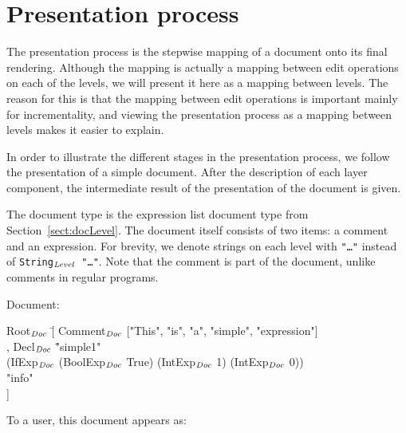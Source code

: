 \documentclass{speauth}
\begin{document}
%																
%																
%																
\section{Presentation process} \label{sect:presprocess}

The presentation process is the stepwise mapping of a document onto its final rendering. Although the mapping is actually a mapping between edit operations on each of the levels, we will present it here as a mapping between levels. The reason for this is that the mapping between edit operations is important mainly for incrementality, and viewing the presentation process as a mapping between levels makes it easier to explain.

In order to illustrate the different stages in the presentation process, we follow the presentation of a simple document. After the description of each layer component, the intermediate result of the presentation of the document is given. 

The document type is the expression list document type from Section~\ref{sect:docLevel}. The document itself consists of two items: a comment and an expression. For brevity, we denote strings on each level with {\tt "\dots"} instead of {\tt String$_{\mathit{Level}}$ "\dots"}. Note that the comment is part of the document, unlike comments in regular programs.

Document:
\small \ttfamily
\begin{tabbing}
Root$_{\mathit{Doc}}$ \= [ Comment$_{\mathit{Doc}}$ ["This", "is", "a", "simple", "expression"] \\
       \> , Decl$_{\mathit{Doc}}$ \= "simple1" \\
       \>                        \>(IfExp$_{\mathit{Doc}}$ (BoolExp$_{\mathit{Doc}}$ True) (IntExp$_{\mathit{Doc}}$ 1) (IntExp$_{\mathit{Doc}}$ 0))\\
       \>                        \> "info"\\
       \> ] 
\end{tabbing}
\rmfamily \normalsize

To a user, this document appears as:\\

\begin{center}
\end{center}
\end{document}
